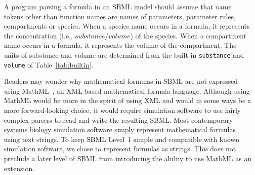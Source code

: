 \documentclass[10pt]{cekarticle}
\newcommand{\vref}[1]{\ref{#1}}
\newcommand{\changed}[1]{\textcolor{BrickRed}{#1}}
\begin{document}
A program parsing a formula in an SBML model should assume that name tokens
other than function names are names of parameters, parameter rules,
compartments or species.  When a \changed{species} name occurs in a
formula, it represents the concentration (i.e., $substance/volume$) of the
\changed{species}.  When a compartment name occurs in a formula, it
represents the volume of the compartment.  The units of substance and
volume are determined from the built-in \texttt{substance} and
\texttt{volume} of Table~\vref{tab:builtin}.

Readers may wonder why mathematical formulas in SBML are not expressed
using MathML~\citep{w3c:2000b}, an XML-based mathematical formula language.
Although using MathML would be more in the spirit of using XML and would in
some ways be a more forward-looking choice, it would require simulation
software to use fairly complex parsers to read and write the resulting
SBML.  Most contemporary systems biology simulation software simply
represent mathematical formulas using text strings.  To keep SBML Level~1
simple and compatible with known simulation software, we chose to represent
formulas as strings.  This does not preclude a later level of SBML from
introducing the ability to use MathML as an extension.






\end{document}
